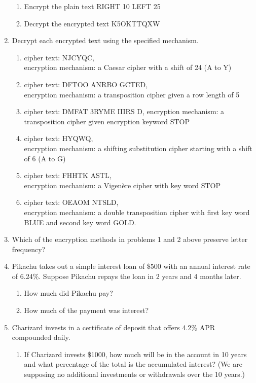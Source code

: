 \documentclass[12pt]{article}
\begin{document}
\begin{enumerate}
	\begin{enumerate}
	\item Encrypt the plain text RIGHT 10 LEFT 25
	\vfill
	\item Decrypt the encrypted text K5OKTTQXW
	\vfill
	\end{enumerate}
\newpage
\item Decrypt each encrypted text using the specified mechanism.
	\begin{enumerate}
	\item cipher text: NJCYQC, \\encryption mechanism: a Caesar cipher with a shift of 24 (A to Y)
	\vfill
	\item cipher text: DFTOO \;\: ANRBO \;\: GCTED, \\encryption mechanism: a transposition cipher given a row length of 5
	\vfill
	\item cipher text: DMFAT \:\: 3RYME \:\: IIIRS \:\: D, encryption mechanism: a transposition cipher given encryption keyword STOP
	\vfill
	\item cipher text: HYQWQ, \\encryption mechanism: a shifting substitution cipher starting with a shift of 6 (A to G)
	\vfill
	\item cipher text: FHHTK \:\: ASTL, \\encryption mechanism: a Vigen\`{e}re cipher with key word STOP
	\vfill
	\item cipher text: OEAOM \:\: NTSLD, \\encryption mechanism: a double transposition cipher with first key word BLUE and second key word GOLD.
	\vfill
	\end{enumerate}
\item Which of the encryption methods in problems 1 and 2 above preserve letter frequency?
\vfill
\newpage
\item Pikachu takes out a simple interest loan of \$500 with an annual interest rate of 6.24\%. Suppose Pikachu repays the loan in 2 years and 4 months later.
	\begin{enumerate}
	\item How much did Pikachu pay?
	\vfill
	\item How much of the payment was interest?
	\vfill
	\end{enumerate}
\item Charizard invests in a certificate of deposit that offers 4.2\% APR compounded daily.
	\begin{enumerate}
	\item If Charizard invests \$1000, how much will be in the account in 10 years and what percentage of the total is the accumulated interest? (We are supposing no additional investments or withdrawals over the 10 years.)

\end{enumerate}
\end{enumerate}
\end{document}
